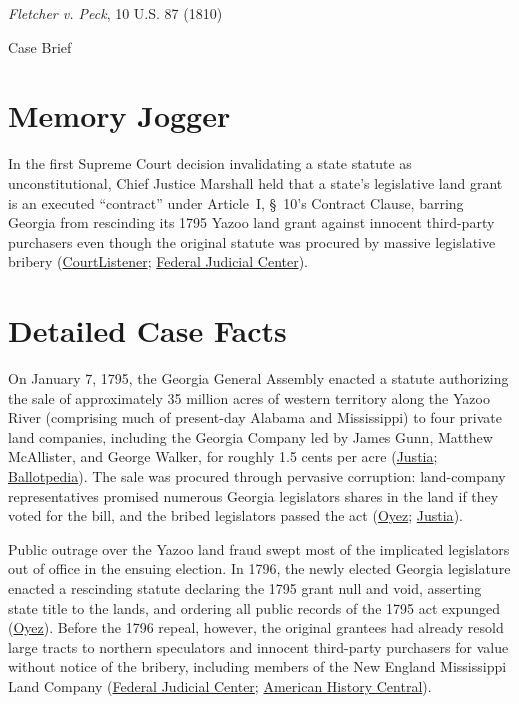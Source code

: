 \documentclass[12pt]{article}
\begin{document}
\begin{center}
{\LARGE \textit{Fletcher v. Peck}, 10 U.S. 87 (1810)\par}
\vspace{0.8em}
{\large Case Brief\par}
\end{center}
\vspace{1em}

\section{Memory Jogger}

In the first Supreme Court decision invalidating a state statute as unconstitutional, Chief Justice Marshall held that a state's legislative land grant is an executed ``contract'' under Article~I, \S~10's Contract Clause, barring Georgia from rescinding its 1795 Yazoo land grant against innocent third-party purchasers even though the original statute was procured by massive legislative bribery (\href{https://www.courtlistener.com/opinion/84935/fletcher-v-peck/}{CourtListener}; \href{https://www.fjc.gov/history/cases/cases-that-shaped-the-federal-courts/fletcher-v-peck}{Federal Judicial Center}).

\section{Detailed Case Facts}

On January 7, 1795, the Georgia General Assembly enacted a statute authorizing the sale of approximately 35 million acres of western territory along the Yazoo River (comprising much of present-day Alabama and Mississippi) to four private land companies, including the Georgia Company led by James Gunn, Matthew McAllister, and George Walker, for roughly 1.5 cents per acre (\href{https://supreme.justia.com/cases/federal/us/10/87/}{Justia}; \href{https://ballotpedia.org/Fletcher_v._Peck}{Ballotpedia}). The sale was procured through pervasive corruption: land-company representatives promised numerous Georgia legislators shares in the land if they voted for the bill, and the bribed legislators passed the act (\href{https://www.oyez.org/cases/1789-1850/10us87}{Oyez}; \href{https://supreme.justia.com/cases/federal/us/10/87/}{Justia}).

Public outrage over the Yazoo land fraud swept most of the implicated legislators out of office in the ensuing election. In 1796, the newly elected Georgia legislature enacted a rescinding statute declaring the 1795 grant null and void, asserting state title to the lands, and ordering all public records of the 1795 act expunged (\href{https://www.oyez.org/cases/1789-1850/10us87}{Oyez}). Before the 1796 repeal, however, the original grantees had already resold large tracts to northern speculators and innocent third-party purchasers for value without notice of the bribery, including members of the New England Mississippi Land Company (\href{https://www.fjc.gov/history/cases/cases-that-shaped-the-federal-courts/fletcher-v-peck}{Federal Judicial Center}; \href{https://www.americanhistorycentral.com/entries/fletcher-v-peck-1810/}{American History Central}).
\end{document}
